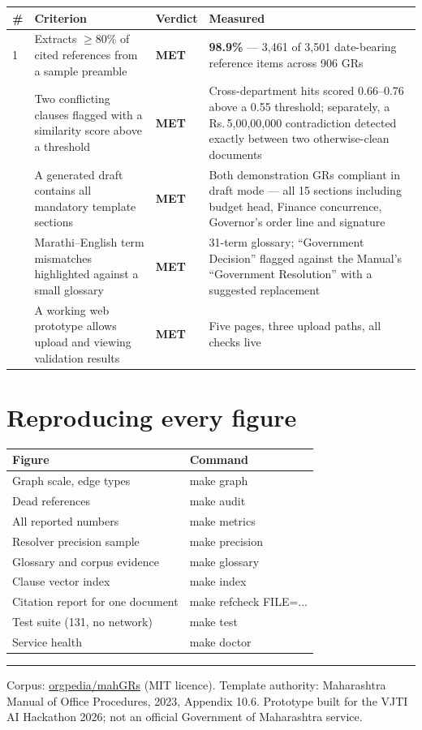 \documentclass[11pt,a4paper]{article}
\newcommand{\code}[1]{{\mono\small #1}}
\newcommand{\MET}{\textcolor{ok}{\textbf{MET}}}
\begin{document}
\begin{longtable}{@{}p{5mm}p{72mm}p{15mm}p{53mm}@{}}
\toprule
\# & \textbf{Criterion} & \textbf{Verdict} & \textbf{Measured} \\
\midrule
\endhead
1 & Extracts $\geq$80\% of cited references from a sample preamble & \MET &
\textbf{98.9\%} --- 3{,}461 of 3{,}501 date-bearing reference items across 906 GRs \\
\addlinespace
2 & Two conflicting clauses flagged with a similarity score above a threshold & \MET &
Cross-department hits scored 0.66--0.76 above a 0.55 threshold; separately, a
Rs.\,5,00,00,000 contradiction detected exactly between two otherwise-clean documents \\
\addlinespace
3 & A generated draft contains all mandatory template sections & \MET &
Both demonstration GRs compliant in draft mode --- all 15 sections including budget head,
Finance concurrence, Governor's order line and signature \\
\addlinespace
4 & Marathi--English term mismatches highlighted against a small glossary & \MET &
31-term glossary; ``Government Decision'' flagged against the Manual's ``Government Resolution''
with a suggested replacement \\
\addlinespace
5 & A working web prototype allows upload and viewing validation results & \MET &
Five pages, three upload paths, all checks live \\
\bottomrule
\end{longtable}

\section{Reproducing every figure}
\label{sec:repro}

\begin{center}
\begin{tabular}{@{}ll@{}}
\toprule
\textbf{Figure} & \textbf{Command} \\
\midrule
Graph scale, edge types & \code{make graph} \\
Dead references & \code{make audit} \\
All reported numbers & \code{make metrics} \\
Resolver precision sample & \code{make precision} \\
Glossary and corpus evidence & \code{make glossary} \\
Clause vector index & \code{make index} \\
Citation report for one document & \code{make refcheck FILE=...} \\
Test suite (131, no network) & \code{make test} \\
Service health & \code{make doctor} \\
\bottomrule
\end{tabular}
\end{center}

\vspace{3mm}
\hrule
\vspace{2mm}
{\small Corpus: \href{https://github.com/orgpedia/mahGRs}{orgpedia/mahGRs} (MIT licence).
Template authority: Maharashtra Manual of Office Procedures, 2023, Appendix 10.6. Prototype built
for the VJTI AI Hackathon 2026; not an official Government of Maharashtra service.}
\end{document}
